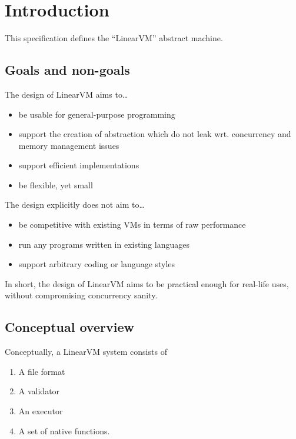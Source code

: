 \documentclass[a4paper]{report}
\begin{document}
\chapter{Introduction}
This specification defines the ``LinearVM'' abstract machine.

\section{Goals and non-goals}
The design of LinearVM aims to\ldots
\begin{itemize}
\item be usable for general-purpose programming

\item support the creation of abstraction which do not leak
  wrt. concurrency and memory management issues

\item support efficient implementations

\item be flexible, yet small
\end{itemize}

\noindent
The design explicitly does not aim to\ldots
\begin{itemize}
\item be competitive with existing VMs in terms of raw performance
\item run any programs written in existing languages
\item support arbitrary coding or language styles
\end{itemize}

In short, the design of LinearVM aims to be practical enough for
real-life uses, without compromising concurrency sanity. %


\section{Conceptual overview}
Conceptually, a LinearVM system consists of
\begin{enumerate}
\item A file format
\item A validator
\item An executor
\item A set of native functions.
\end{enumerate}
\end{document}
